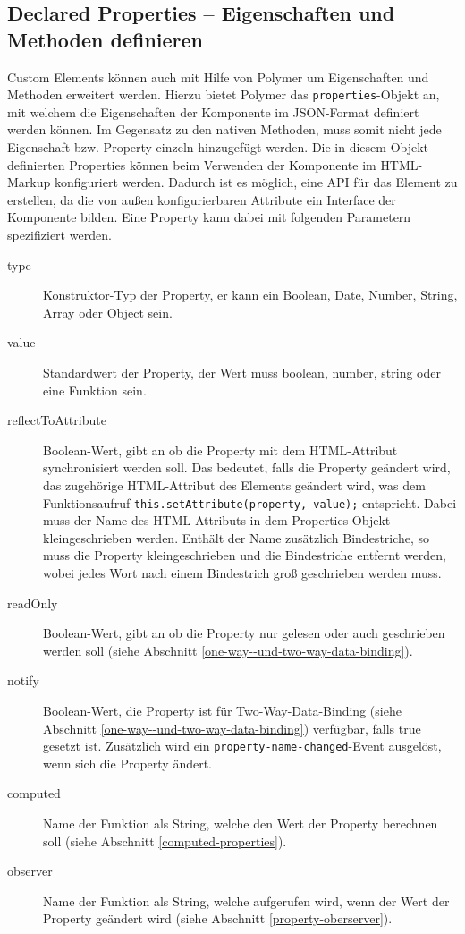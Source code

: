 \subsection{Declared Properties -- Eigenschaften und Methoden definieren}\label{declared-properties---eigenschaften-und-methoden-definieren}

Custom Elements können auch mit Hilfe von Polymer um Eigenschaften und Methoden erweitert werden. Hierzu bietet Polymer das \texttt{properties}-Objekt an, mit welchem die Eigenschaften der Komponente im JSON-Format definiert werden können. Im Gegensatz zu den nativen Methoden, muss somit nicht jede Eigenschaft bzw. Property einzeln hinzugefügt werden. Die in diesem Objekt definierten Properties können beim Verwenden der Komponente im \ac{HTML}-Markup konfiguriert werden. Dadurch ist es möglich, eine \ac{API} für das Element zu erstellen, da die von außen konfigurierbaren Attribute ein Interface der Komponente bilden. Eine Property kann dabei mit folgenden Parametern spezifiziert werden.

\begin{description}
  \item[type] Konstruktor-Typ der Property, er kann ein Boolean, Date, Number, String, Array oder Object sein.
  \item[value] Standardwert der Property, der Wert muss boolean, number, string oder eine Funktion sein.
  \item[reflectToAttribute] Boolean-Wert, gibt an ob die Property mit dem \ac{HTML}-Attribut synchronisiert werden soll. Das bedeutet, falls die Property geändert wird, das zugehörige \ac{HTML}-Attribut des Elements geändert wird, was dem Funktionsaufruf \texttt{this.setAttribute(property,\ value);} entspricht. Dabei muss der Name des \ac{HTML}-Attributs in dem Properties-Objekt kleingeschrieben werden. Enthält der Name zusätzlich Bindestriche, so muss die Property kleingeschrieben und die Bindestriche entfernt werden, wobei jedes Wort nach einem Bindestrich groß geschrieben werden muss.
  \item[readOnly] Boolean-Wert, gibt an ob die Property nur gelesen oder auch geschrieben werden soll (siehe Abschnitt \ref{one-way--und-two-way-data-binding}).
  \item[notify] Boolean-Wert, die Property ist für Two-Way-Data-Binding (siehe Abschnitt \ref{one-way--und-two-way-data-binding}) verfügbar, falls true gesetzt ist. Zusätzlich wird ein \texttt{property-name-changed}-Event ausgelöst, wenn sich die Property ändert.
  \item[computed] Name der Funktion als String, welche den Wert der Property berechnen soll (siehe Abschnitt \ref{computed-properties}).
  \item[observer] Name der Funktion als String, welche aufgerufen wird, wenn der Wert der Property geändert wird (siehe Abschnitt \ref{property-oberserver}).
\end{description}

